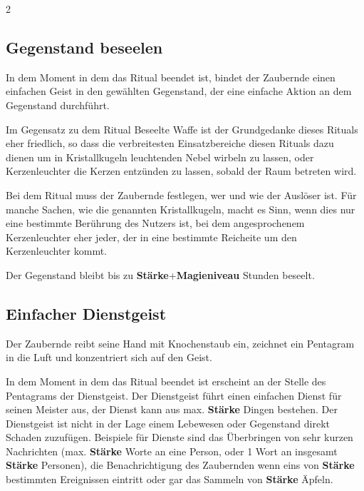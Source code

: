 \begin{multicols*}{2}


\subsection{Gegenstand beseelen}

In dem Moment in dem das Ritual beendet ist, bindet der Zaubernde einen einfachen Geist in den gewählten Gegenstand, der eine einfache Aktion an dem Gegenstand durchführt.

Im Gegensatz zu dem Ritual Beseelte Waffe ist der Grundgedanke dieses Rituals eher friedlich, so dass die verbreitesten Einsatzbereiche diesen Rituals dazu dienen um in Kristallkugeln leuchtenden Nebel wirbeln zu lassen, oder Kerzenleuchter die Kerzen entzünden zu lassen, sobald der Raum betreten wird.

Bei dem Ritual muss der Zaubernde festlegen, wer und wie der Auslöser ist. Für manche Sachen, wie die genannten Kristallkugeln, macht es Sinn, wenn dies nur eine bestimmte Berührung des Nutzers ist, bei dem angesprochenem Kerzenleuchter eher jeder, der in eine bestimmte Reicheite um den Kerzenleuchter kommt.

Der Gegenstand bleibt bis zu \textbf{Stärke}+\textbf{Magieniveau} Stunden beseelt.



\subsection{Einfacher Dienstgeist}

Der Zaubernde reibt seine Hand mit Knochenstaub ein, zeichnet ein Pentagram in die Luft und konzentriert sich auf den Geist.

In dem Moment in dem das Ritual beendet ist erscheint an der Stelle des Pentagrams der Dienstgeist. Der Dienstgeist führt einen einfachen Dienst für seinen Meister aus, der Dienst kann aus max. \textbf{Stärke} Dingen bestehen. Der Dienstgeist ist nicht in der Lage einem Lebewesen oder Gegenstand direkt Schaden zuzufügen. Beispiele für Dienste sind das Überbringen von sehr kurzen Nachrichten (max. \textbf{Stärke} Worte an eine Person, oder 1 Wort an insgesamt \textbf{Stärke} Personen), die Benachrichtigung des Zaubernden wenn eins von \textbf{Stärke} bestimmten Ereignissen eintritt oder gar das Sammeln von \textbf{Stärke} Äpfeln.


\end{multicols*}
